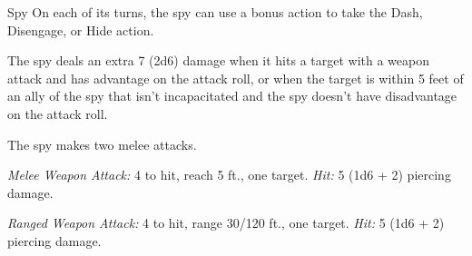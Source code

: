 \documentclass[10pt,a4paper,twoside,bg=print,twocolumn,openany,nodeprecatedcode]{dndbook}
\begin{document}
\begin{DndMonster}[float=t]{Spy}
\DndMonsterBasics[
armor-class = {12},
hit-points = {\DndDice{6d8}},
speed = {30 ft.}
]
\DndMonsterAbilityScores[
 str = 10,
 dex = 15,
 con = 10,
 int = 12,
 wis = 14,
 cha = 16
]
\DndMonsterDetails[
skills = {Deception +5, Insight +4, Investigation +5, Perception +6, Persuasion +5, Sleight Of Hand +4, Stealth +4},
languages = {any two languages},
challenge = 1,
]
On each of its turns, the spy can use a bonus action to take the Dash, Disengage, or Hide action.

The spy deals an extra 7 (2d6) damage when it hits a target with a weapon attack and has advantage on the attack roll, or when the target is within 5 feet of an ally of the spy that isn't incapacitated and the spy doesn't have disadvantage on the attack roll.

The spy makes two melee attacks.

\textsl{Melee Weapon Attack:} 4 to hit, reach 5 ft., one target. \textsl{Hit:} 5 (1d6 + 2) piercing damage.

\textsl{Ranged Weapon Attack:} 4 to hit, range 30/120 ft., one target. \textsl{Hit:} 5 (1d6 + 2) piercing damage.

\end{DndMonster}
\end{document}

